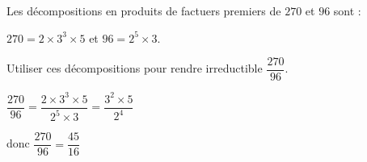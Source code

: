\begin{exercice*}
    Les décompositions en produits de factuers premiers de $270$ et $96$ sont :

    $270=2\times 3^3\times 5$ et $96=2^5\times 3$.

    Utiliser ces décompositions pour rendre irreductible $\dfrac{270}{96}$.

\end{exercice*}
\begin{corrige}

    $\dfrac{270}{96} = \dfrac{2\times 3^3\times 5}{2^5\times 3}=\dfrac{3^2\times 5}{2^4}$

    donc $\dfrac{270}{96} = \dfrac{45}{16}$
\end{corrige}

